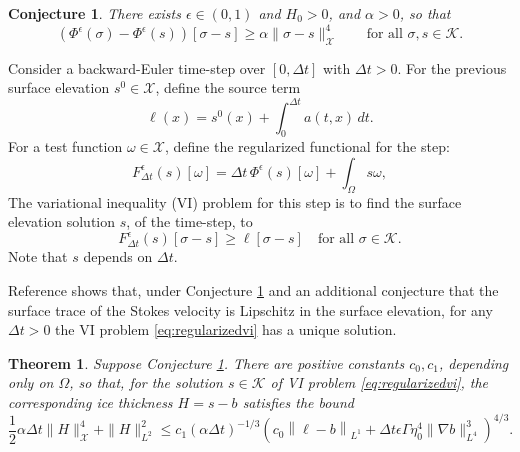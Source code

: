 \documentclass[12pt]{article}
\newtheorem{theorem}{Theorem}
\newtheorem{conjecture}{Conjecture}
\newcommand{\cK}{\ensuremath{\mathcal{K}}}
\newcommand{\cX}{\ensuremath{\mathcal{X}}}
\newcommand{\grad}{\ensuremath{\nabla}}
\newcommand{\eps}{\ensuremath{\epsilon}}
\begin{document}
\begin{conjecture} \label{conj:regcoercive}  There exists $\eps \in (0,1)$ and $H_0>0$, and $\alpha>0$, so that
\begin{equation}
\left(\Phi^\eps(\sigma) - \Phi^\eps(s)\right)[\sigma-s] \ge \alpha \|\sigma-s\|_{\cX}^4 \qquad \text{for all } \sigma,s\in\cK. \label{eq:regcoercive}
\end{equation}
\end{conjecture}

Consider a backward-Euler time-step over $[0,\Delta t]$ with $\Delta t > 0$.  For the previous surface elevation $s^0\in\cX$, define the source term
\begin{equation}
\ell(x) = s^0(x) + \int_{0}^{\Delta t} a(t,x)\,dt. \label{eq:be:source}
\end{equation}
For a test function $\omega\in\cX$, define the regularized functional for the step:
\begin{equation}
F^\eps_{\Delta t}(s)[\omega] = \Delta t\,\Phi^\eps(s)[\omega] + \int_\Omega s \omega, \label{eq:regularizedF}
\end{equation}
The variational inequality (VI) problem for this step is to find the surface elevation solution $s$, of the time-step, to
\begin{equation}
F^\eps_{\Delta t}(s)[\sigma-s] \ge \ell[\sigma-s] \quad \text{for all } \sigma \in \cK. \label{eq:regularizedvi}
\end{equation}
Note that $s$ depends on $\Delta t$.

Reference \cite{Bueler2025} shows that, under Conjecture \ref{conj:regcoercive} and an additional conjecture that the surface trace of the Stokes velocity is Lipschitz in the surface elevation, for any $\Delta t>0$ the VI problem \eqref{eq:regularizedvi} has a unique solution.

\begin{theorem}
Suppose Conjecture \ref{conj:regcoercive}.  There are positive constants $c_0,c_1$, depending only on $\Omega$, so that, for the solution $s\in\cK$ of VI problem \eqref{eq:regularizedvi}, the corresponding ice thickness $H=s-b$ satisfies the bound
\begin{equation}
\frac{1}{2} \alpha \Delta t \|H\|_{\cX}^4 + \|H\|_{L^2}^2 \le c_1 (\alpha \Delta t)^{-1/3} \left(c_0\left\|\ell-b\right\|_{L^1}  + \Delta t \eps \Gamma \eta_0^4 \|\grad b\|_{L^4}^3\right)^{4/3}. \label{eq:thebound}
\end{equation}
\end{theorem}
\end{document}
